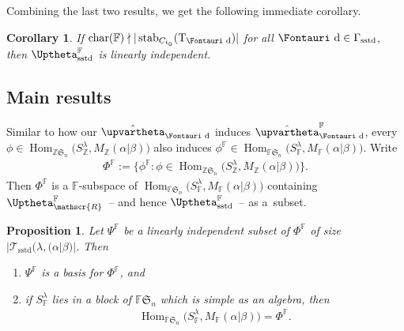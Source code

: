\documentclass[pdftex]{sigma}
\newtheorem{Corollary}[Theorem]{Corollary}
\newtheorem{Proposition}[Theorem]{Proposition}
 { \theoremstyle{definition}
\newtheorem{Definition}[Theorem]{Definition}
\newtheorem{Example}[Theorem]{Example}
\newtheorem{Remark}[Theorem]{Remark} }
\renewcommand{\t}{\mathfrak{t}}
\newcommand{\TTS}{\mathscr{T}_\mathrm{sstd}}
\newcommand{\T}{\mathrm{T}}
\newcommand{\Char}{\operatorname{\mathrm{char}}}
\newcommand{\Hom}{\operatorname{Hom}}
\newcommand{\stab}{\operatorname{stab}}
\newcommand{\sym}[1]{\mathfrak{S}_{#1}}
\newcommand{\F}{\mathbb{F}}
\newcommand{\R}{\mathscr{R}}
\newcommand{\dR}{\text{\Fontauri d}}
\newcommand{\Z}{\mathbb{Z}}
\newcommand{\Jhom}{\upvartheta}
\newcommand{\hJhom}{\hat{\Jhom}}
\newcommand{\JHOM}{\Uptheta}
\newcommand{\hJHOM}{{\JHOM}}
\begin{document}
Combining the last two results, we get the following immediate corollary.

\begin{Corollary} \label{C:li}
If $\Char(\F) \nmid |\stab_{C_{\t_0}}(\T_\dR)|$ for all $\dR \in \Gamma_{\mathrm{sstd}}$, then $\hJHOM_{\mathrm{sstd}}^{\F}$ is linearly independent.
\end{Corollary}

\subsection{Main results}

Similar to how our $\hJhom_{\dR}$ induces $\hJhom_{\dR}^{\F}$, every $\phi \in \Hom_{\Z\sym{n}}\big(S_{\Z}^{\lambda}, M_{\Z}(\alpha|\beta)\big)$ also induces \linebreak $\phi^{\F} \in \Hom_{\F\sym{n}}\big(S_{\F}^{\lambda}, M_{\F}(\alpha|\beta)\big)$. Write
\begin{gather*}
\Phi^{\F} := \big\{ \phi^{\F} \colon \phi \in \Hom_{\Z\sym{n}}\big(S_{\Z}^{\lambda}, M_{\Z}(\alpha|\beta)\big)\big\}.
\end{gather*}
Then $\Phi^{\F}$ is a $\F$-subspace of $\Hom_{\F\sym{n}}\big(S_{\F}^{\lambda}, M_{\F}(\alpha|\beta)\big)$ containing $\hJHOM^{\F}_{\R}$~-- and hence $\hJHOM^{\F}_{\mathrm{sstd}}$~-- as a~subset.

\begin{Proposition} \label{P:LIimpliesbasis}
	Let $\Psi^{\F}$ be a linearly independent subset of $\Phi^{\F}$ of size $|\TTS(\lambda, (\alpha|\beta)|$. Then
\begin{enumerate}\itemsep=0pt
 \item [$(i)$] $\Psi^{\F}$ is a basis for $\Phi^{\F}$, and
 \item [$(ii)$] if $S_{\F}^{\lambda}$ lies in a block of $\F\sym{n}$ which is simple as an algebra, then \begin{gather*}\Hom_{\F\sym{n}}\big(S^{\lambda}_{\F}, M_\F(\alpha|\beta)\big)=\Phi^\F.\end{gather*}
\end{enumerate}
\end{Proposition}
\end{document}
